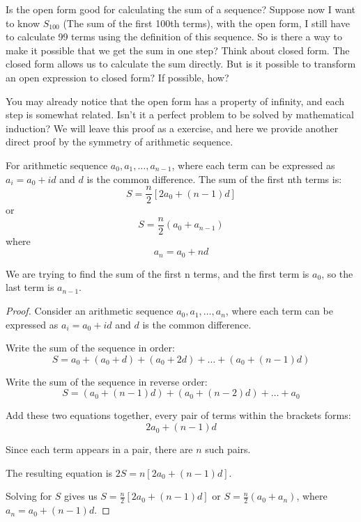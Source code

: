 Is the open form good for calculating the sum of a sequence? Suppose now I want to know $S_{100}$ (The sum of the first 100th terms),
with the open form, I still have to calculate 99 terms using the definition of this sequence. So is there a way 
to make it possible that we get the sum in one step? Think about closed form. The closed form allows us to calculate
the sum directly. But is it possible to transform an open expression to closed form? If possible, how?

You may already notice that the open form has a property of infinity, and each step is somewhat related.
Isn't it a perfect problem to be solved by mathematical induction? We will leave this proof as a exercise, and here we provide another direct proof
by the symmetry of arithmetic sequence.
\begin{theorem}
    For  arithmetic sequence \( a_0, a_1, \ldots, a_{n-1} \), where each term can be expressed as \( a_i = a_0 + id \) and \( d \) is the common difference. The sum of the first nth terms is:
    \[ S = \frac{n}{2}[2a_0 + (n-1)d] \] or \[ S = \frac{n}{2}(a_0 + a_{n-1}) \] where \[ a_n = a_0 + nd \]
\end{theorem}
\begin{remark}
    We are trying to find the sum of the first n terms, and the first term is $a_0$, so the last term is
    $a_{n-1}$.
\end{remark}
\begin{proof}
    Consider an arithmetic sequence \( a_0, a_1, \ldots, a_n \), where each term can be expressed as \( a_i = a_0 + id \) and \( d \) is the common difference.
    \item Write the sum of the sequence in order:
\[
S = a_0 + (a_0 + d) + (a_0 + 2d) + \ldots + (a_0 + (n-1)d)
\]

\item Write the sum of the sequence in reverse order:
\[
S = (a_0 + (n-1)d) + (a_0 + (n-2)d) + \ldots + a_0
\]

\item Add these two equations together, every pair of terms within the brackets forms: \[ 2a_0 + (n-1)d \]

\item Since each term appears in a pair, there are \( n \) such pairs.

\item The resulting equation is \( 2S = n[2a_0 + (n-1)d] \).

\item Solving for \( S \) gives us \( S = \frac{n}{2}[2a_0 + (n-1)d] \) or \( S = \frac{n}{2}(a_0 + a_n) \), where \( a_n = a_0 + (n-1)d \).
\end{proof}



